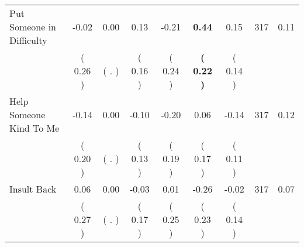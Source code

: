 \begin{tabular}{lcccccccc}
Put Someone in Difficulty &     -0.02 &      0.00 &      0.13 &     -0.21 & \textbf{     0.44} &      0.15 & 317 &       0.11 \\ 
 & (     0.26 ) & (        . ) & (     0.16 ) & (     0.24 ) & \textbf{(     0.22 )} & (     0.14 ) & \\
Help Someone Kind To Me &     -0.14 &      0.00 &     -0.10 &     -0.20 &      0.06 &     -0.14 & 317 &       0.12 \\ 
 & (     0.20 ) & (        . ) & (     0.13 ) & (     0.19 ) & (     0.17 ) & (     0.11 ) & \\
Insult Back &      0.06 &      0.00 &     -0.03 &      0.01 &     -0.26 &     -0.02 & 317 &       0.07 \\ 
 & (     0.27 ) & (        . ) & (     0.17 ) & (     0.25 ) & (     0.23 ) & (     0.14 ) & \\
\bottomrule
\end{tabular}
